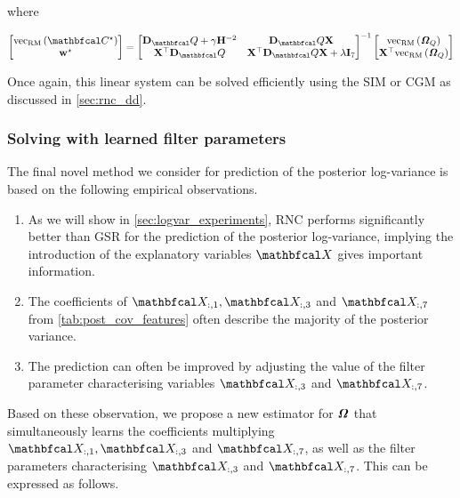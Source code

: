 where

\begin{equation}
    \begin{bmatrix}
        \vecrm{\Ct^\star} \\ \w^\star 
    \end{bmatrix} = \begin{bmatrix}
        \D_\Qt + \gamma \HH^{-2} & \D_\Qt \X \\
        \X^\top \D_\Qt & \X^\top \D_\Qt \X + \lambda \I_7
    \end{bmatrix}^{-1} \begin{bmatrix}
        \vecrm{\Omegat_Q} \\ \X^\top \vecrm{\Omegat_Q}
    \end{bmatrix}
\end{equation} 


Once again, this linear system can be solved efficiently using the SIM or CGM as discussed in \cref{sec:rnc_dd}. 


\subsubsection{Solving with learned filter parameters}

The final novel method we consider for prediction of the posterior log-variance is based on the following empirical observations.

\begin{enumerate}
    \item As we will show in \cref{sec:logvar_experiments}, RNC performs significantly better than GSR for the prediction of the posterior log-variance, implying the introduction of the explanatory variables $\Xt$ gives important information. 
    \item The coefficients of $\Xt_{:, 1}, \Xt_{:, 3}$ and $\Xt_{:, 7}$ from \cref{tab:post_cov_features} often describe the majority of the posterior variance. 
    \item The prediction can often be improved by adjusting the value of the filter parameter characterising variables $\Xt_{:, 3}$ and $\Xt_{:, 7}$. 
\end{enumerate}

Based on these observation, we propose a new estimator for $\bm{\mathit{\Omega}}$ that simultaneously learns the coefficients multiplying $\Xt_{:, 1}, \Xt_{:, 3}$ and $\Xt_{:, 7}$, as well as the filter parameters characterising $\Xt_{:, 3}$ and $\Xt_{:, 7}$. This can be expressed as follows. 

